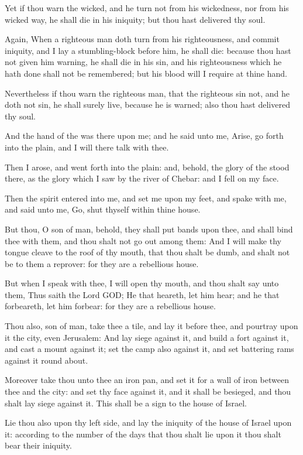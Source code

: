 \Verse Yet if thou warn the wicked, and he turn not from his wickedness, nor from his wicked way, he shall die in his iniquity; but thou hast delivered thy soul.

\Verse Again, When a righteous man doth turn from his righteousness, and commit iniquity, and I lay a stumbling-block before him, he shall die: because thou hast not given him warning, he shall die in his sin, and his righteousness which he hath done shall not be remembered; but his blood will I require at thine hand.

\Verse Nevertheless if thou warn the righteous man, that the righteous sin not, and he doth not sin, he shall surely live, because he is warned; also thou hast delivered thy soul.

\Verse And the hand of the \LORD was there upon me; and he said unto me, Arise, go forth into the plain, and I will there talk with thee.

\Verse Then I arose, and went forth into the plain: and, behold, the glory of the \LORD stood there, as the glory which I saw by the river of Chebar: and I fell on my face.

\Verse Then the spirit entered into me, and set me upon my feet, and spake with me, and said unto me, Go, shut thyself within thine house.

\Verse But thou, O son of man, behold, they shall put bands upon thee, and shall bind thee with them, and thou shalt not go out among them: \Verse And I will make thy tongue cleave to the roof of thy mouth, that thou shalt be dumb, and shalt not be to them a reprover: for they are a rebellious house.

\Verse But when I speak with thee, I will open thy mouth, and thou shalt say unto them, Thus saith the Lord GOD; He that heareth, let him hear; and he that forbeareth, let him forbear: for they are a rebellious house.


\Chapter
\Verse Thou also, son of man, take thee a tile, and lay it before thee, and pourtray upon it the city, even Jerusalem: \Verse And lay siege against it, and build a fort against it, and cast a mount against it; set the camp also against it, and set battering rams against it round about.

\Verse Moreover take thou unto thee an iron pan, and set it for a wall of iron between thee and the city: and set thy face against it, and it shall be besieged, and thou shalt lay siege against it. This shall be a sign to the house of Israel.

\Verse Lie thou also upon thy left side, and lay the iniquity of the house of Israel upon it: according to the number of the days that thou shalt lie upon it thou shalt bear their iniquity.

